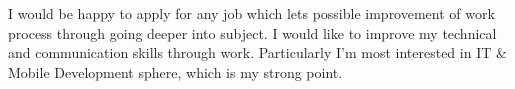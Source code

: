 \documentclass[10pt,a4paper]{cv}
\begin{document}
\clearpage

I would be happy to apply for any job which lets possible improvement of work process through going deeper into subject. I would like to improve my technical and communication skills through work. Particularly I’m most interested in IT \& Mobile Development sphere, which is my strong point.
\end{document}
